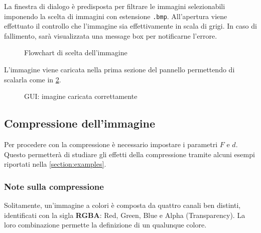 \documentclass[11pt,italian]{article}
\begin{document}
La finestra di dialogo è predisposta per filtrare le immagini selezionabili imponendo la scelta di immagini con estensione \lstinline{.bmp}. All'apertura viene effettuato il controllo che l'immagine sia effettivamente in scala di grigi. In caso di fallimento, sarà visualizzata una message box per notificarne l'errore.

\begin{figure}[H]
    \caption{Flowchart di scelta dell'immagine}
    \label{fig:flow-image-pick}
\end{figure}

\noindent
L'immagine viene caricata nella prima sezione del pannello permettendo di scalarla come in \cref{fig:application-image-loaded}.
\begin{figure}[H]
    \caption{GUI: imagine caricata correttamente}
    \label{fig:application-image-loaded}
\end{figure}

\subsection{Compressione dell'immagine}
Per procedere con la compressione è necessario impostare i parametri $F$ e $d$. Questo permetterà di studiare gli effetti della compressione tramite alcuni esempi riportati nella \cref{section:examples}.

\subsubsection*{Note sulla compressione}
Solitamente, un'immagine a colori è composta da quattro canali ben distinti, identificati con la sigla \textbf{RGBA}: Red, Green, Blue e Alpha (Transparency).
La loro combinazione permette la definizione di un qualunque colore.
\end{document}
